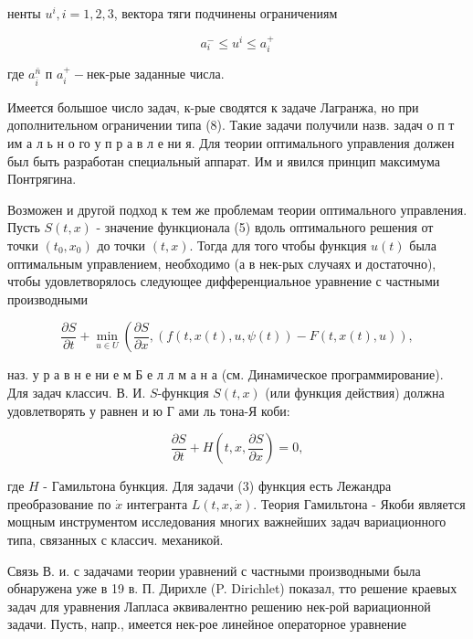 \documentclass[10pt]{article}
\begin{document}
ненты $u^{i}, i=1,2,3$, вектора тяги подчинены ограничениям



\[

a_{i}^{-} \leqslant u^{i} \leqslant a_{i}^{+}

\]



где $a_{\bar{i}}^{\bar{n}}$ п $a_{i}^{+}-$нек-рые заданные числа.



Имеется болышое число задач, к-рые сводятся к задаче Лагранжа, но при дополнительном ограничении типа (8). Такие задачи получили назв. задач о п т им а л ь н о го у п р а в л е ни я. Для теории оптимального управления должен был быть разработан специальный аппарат. Им и явился принцип максимума Понтрягина.



Возможен и другой подход к тем же проблемам теории оптимального управления. Пусть $S(t, x)$ - значение функционала (5) вдоль оптимального решения от точки $\left(t_{0}, x_{0}\right)$ до точки $(t, x)$. Тогда для того чтобы функция $u(t)$ была оптимальным управлением, необходимо (а в нек-рых случаях и достаточно), чтобы удовлетворялось следующее дифференциальное уравнение с частными производными



\[

\frac{\partial S}{\partial t}+\min _{u \in U}\left(\frac{\partial S}{\partial x},(f(t, x(t), u, \psi(t))-F(t, x(t), u)),\right.

\]



наз. у р а в н е ни е м Б е л л м а н а (см. Динамическое программирование). Для задач классич. В. И. $S$-функция $S(t, x)$ (или функция действия) должна удовлетворять у равнен и ю $Г$ ами ль тона-Я коби:



\[

\frac{\partial S}{\partial t}+H\left(t, x, \frac{\partial S}{\partial x}\right)=0,

\]



где $H$ - Гамильтона бункция. Для задачи (3) функция есть Лежандра преобразование по $\dot{x}$ интегранта $L(t, x, \dot{x})$. Теория Гамильтона - Якоби является мощным инструментом исследования многих важнейших задач вариационного типа, связанных с классич. механикой.



Связь В. и. с задачами теории уравнений с частными производными была обнаружена уже в 19 в. П. Дирихле (P. Dirichlet) показал, тто решение краевых задач для уравнения Лапласа әквивалентно решению нек-рой вариационной задачи. Пусть, напр., имеется нек-рое линейное операторное уравнение
\end{document}
